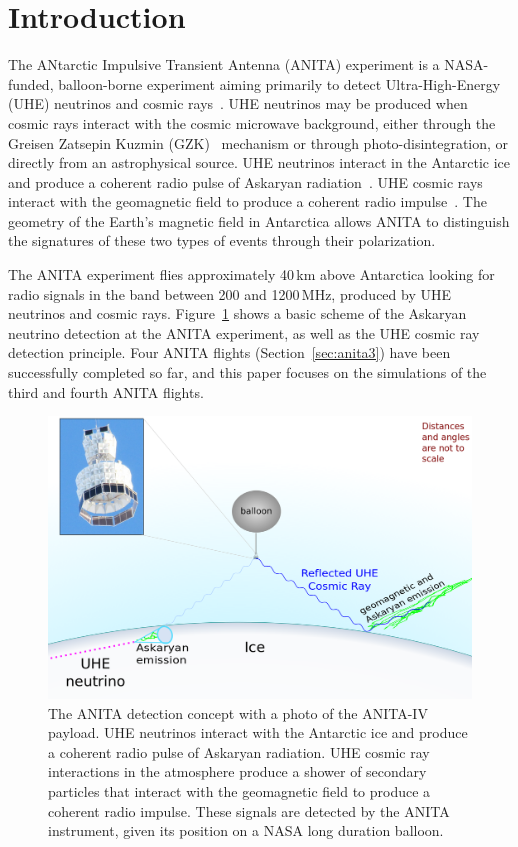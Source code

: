 \section{Introduction}
The ANtarctic Impulsive Transient Antenna (ANITA) experiment is a NASA-funded, balloon-borne experiment aiming primarily to detect Ultra-High-Energy (UHE) neutrinos and cosmic rays~\cite{ANITA1detector,ANITA1paper,ANITA2paper,ANITA2erratum}.
UHE neutrinos may be produced when cosmic rays interact with the
cosmic microwave background, either through the Greisen Zatsepin
Kuzmin (GZK)~\cite{greisen1966end,zatsepin1966gt} mechanism or through photo-disintegration, or directly from an astrophysical source.
UHE neutrinos interact in the Antarctic ice and produce a coherent radio pulse of Askaryan radiation~\cite{askaryan}. UHE cosmic rays interact with the geomagnetic field to produce a coherent radio impulse~\cite{suprun2003synchrotron,falcke2003detecting,ANITA1UHECR}. The geometry of the Earth's magnetic field in Antarctica allows ANITA to distinguish the signatures of these two types of events through their polarization.

The ANITA experiment flies approximately 40\,km above Antarctica looking for radio signals in the band between 200 and 1200\,MHz, produced by UHE neutrinos and cosmic rays.
Figure~\ref{fig:intro_ANITAconcept} shows a basic scheme of the
Askaryan neutrino detection at the ANITA experiment, as well as the UHE cosmic ray detection principle.
Four ANITA flights (Section~\ref{sec:anita3}) have been successfully completed so far, and this paper focuses on the simulations of the third and fourth ANITA flights.

\begin{figure}[!h]\centering
  \includegraphics[width=.8\linewidth]{./Figs/ANITA_scheme_icemcpaper.png}
  \caption{The ANITA detection concept with a photo of the ANITA-IV payload. UHE neutrinos interact with the Antarctic ice and produce a coherent radio pulse of Askaryan radiation. UHE cosmic ray interactions in the atmosphere produce a shower of secondary particles that interact with the geomagnetic field to produce a coherent radio impulse. These signals are detected by the ANITA instrument, given its position on a NASA long duration balloon. %
  }
  \label{fig:intro_ANITAconcept}
\end{figure}



